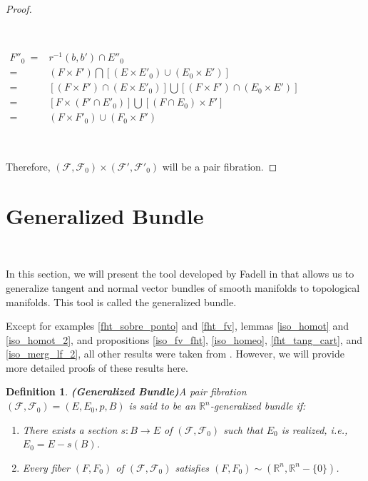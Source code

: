 \documentclass[12pt,oneside]{book}
\newtheorem{defi}   {Definition}[chapter]
\newcommand{\R}{\mathbb{R}}
\begin{document}
\begin{proof}
        \

        \

        $\begin{array}{rl}
            F''_{0} \ = & r^{-1}(b,b')\cap E''_{0} \\
            = & (F\times F')\bigcap [(E\times E'_{0})\cup (E_{0}\times E')] \\
            = & [(F\times F')\cap (E\times E'_{0})]\bigcup [(F\times F')\cap (E_{0}\times E')] \\
            = & [F\times (F'\cap E'_{0})]\bigcup [(F\cap E_{0})\times F'] \\
            = & (F\times F'_{0})\cup (F_{0}\times F')
        \end{array}$
        
        \
        
        Therefore, $(\mathcal{F},\mathcal{F}_{0})\times (\mathcal{F'},\mathcal{F'}_{0})$ will be a pair fibration.
        
    \end{proof}

    

    \section{Generalized Bundle}\label{secao_fib_gener}

    \

    In this section, we will present the tool developed by Fadell in \cite{fadell_1} that allows us to generalize 
    tangent and normal vector bundles of smooth manifolds to 
    topological manifolds. This tool is called the generalized bundle.

    Except for examples \ref{fht_sobre_ponto} and \ref{fht_fv}, lemmas \ref{iso_homot} and \ref{iso_homot_2}, and propositions 
    \ref{iso_fv_fht}, \ref{iso_homeo}, \ref{fht_tang_cart}, and \ref{iso_merg_lf_2}, all other results were taken from \cite{fadell_1}. 
    However, we will provide more detailed proofs of these results here.
    
    \begin{defi}{\bf (Generalized Bundle)}\label{defi_fib_gen}
        A pair fibration $(\mathcal{F},\mathcal{F}_{0})=(E,E_{0},p,B)$ is said to be an $\R^{n}$-generalized 
        bundle if:
    
        \begin{enumerate}
            \item There exists a section $s:B\to E$ of $(\mathcal{F},\mathcal{F}_{0})$ such that $E_{0}$ is realized, i.e., 
            $E_{0}=E-s(B)$.
            \item Every fiber $(F,F_{0})$ of $(\mathcal{F},\mathcal{F}_{0})$ satisfies $(F,F_{0})\sim (\R^{n},\R^{n}-\{ 0 \})$.
        \end{enumerate}
    \end{defi}
    
\end{document}
